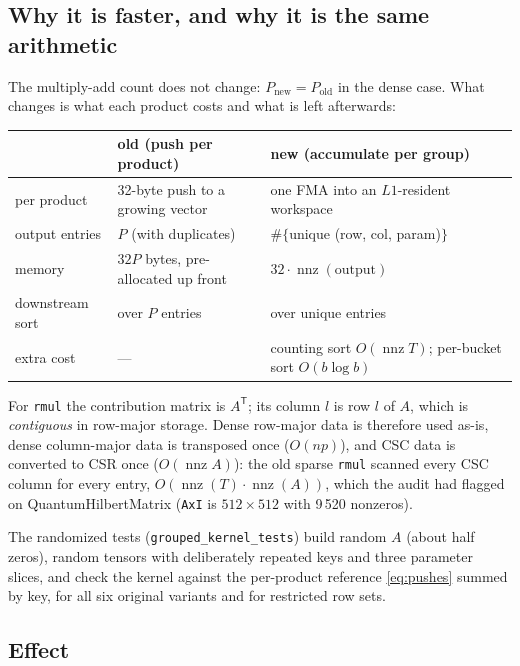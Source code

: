 \documentclass[11pt,a4paper]{article}
\newcommand{\nnz}{\operatorname{nnz}}
\newcommand{\code}[1]{\texttt{#1}}
\newcommand{\T}{\mathsf{T}}
\begin{document}
\subsection{Why it is faster, and why it is the same arithmetic}

The multiply-add count does not change: $P_{\text{new}} = P_{\text{old}}$ in the dense case.
What changes is what each product costs and what is left afterwards:
\begin{center}
\footnotesize
\setlength{\tabcolsep}{4pt}
\begin{tabular}{lll}
\toprule
 & old (push per product) & new (accumulate per group) \\
\midrule
per product & 32-byte push to a growing vector & one FMA into an $L1$-resident workspace \\
output entries & $P$ (with duplicates) & $\#\{$unique (row, col, param)$\}$ \\
memory & $32P$ bytes, pre-allocated up front & $32 \cdot \nnz(\text{output})$ \\
downstream sort & over $P$ entries & over unique entries \\
extra cost & --- & counting sort $O(\nnz T)$; per-bucket sort $O(b \log b)$ \\
\bottomrule
\end{tabular}
\end{center}
For \code{rmul} the contribution matrix is $A^\T$; its column $l$ is row $l$ of $A$, which is
\emph{contiguous} in row-major storage. Dense row-major data is therefore used as-is, dense column-major
data is transposed once ($O(np)$), and CSC data is converted to CSR once ($O(\nnz A)$): the old sparse
\code{rmul} scanned every CSC column for every entry, $O(\nnz(T)\cdot\nnz(A))$, which the audit had
flagged on QuantumHilbertMatrix (\code{AxI} is $512\times512$ with 9\,520 nonzeros).

The randomized tests (\code{grouped\_kernel\_tests}) build random $A$ (about half zeros), random
tensors with deliberately repeated keys and three parameter slices, and check the kernel against the
per-product reference \eqref{eq:pushes} summed by key, for all six original variants and for restricted
row sets.

\subsection{Effect}
\end{document}
